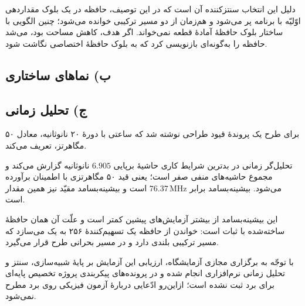 \documentclass[12pt,a4paper]{article}
\begin{document}
	دلیل این انتخاب سنتز‌کننده آن است که در این توصیف، حافظه در یک بلوک مقداردهی اوّلیّه با برنامه پر می‌شود و هم‌زمان از دو مسیر ترکیبی خوانده می‌شود؛ چنین الگویی با ساختار بلوک حافظهٔ آمادهٔ قطعه نمی‌خواند. اگر هدف، کاهش مساحت بود، می‌شد حافظه را به‌گونه‌ای بازنویسی کرد که به بلوک حافظهٔ اختصاصی نگاشت شود.

	\subsection*{ب) نماهای ساختاری}

	\subsection*{ج) تحلیل زمانی}
	برای طرح یک پروندهٔ قیود طراحی نوشته شد که ساعتی با دورهٔ ۲۰ نانوثانیه، معادل ۵۰ مگاهرتز، تعریف می‌کند.



	تحلیل‌گر زمانی در بدترین شرایط کاری حاشیهٔ برپایی \(6.905\) نانوثانیه گزارش می‌کند و مجموع حاشیه‌های منفی صفر است؛ یعنی قید ۵۰ مگاهرتزی با اطمینان برآورده می‌شود. بیشینه‌بسامد برابر \(76.37\,\mathrm{MHz}\) است و بیشینه‌بسامد مقیّد نیز همین مقدار است.


	این بیشینه‌بسامد از بیشتر آزمایش‌های پیشین کمتر است و علّت آن همان حافظهٔ ساخته‌شده با ثبات است: خواندن از حافظه یک تسهیم‌کنندهٔ ۲۵۶ به یک می‌سازد که مسیر ترکیبی بلندی دارد و در مسیر بحرانی طرح قرار می‌گیرد.

	با توجّه به برگزاری مجازی آزمایشگاه، ارزیابی این آزمایش بر پایهٔ شبیه‌سازی، سنتز و تحلیل زمانی نرم‌افزاری انجام شده و در پرونده‌های پیکربندی پروژه تخصیص پایه‌ای برای برد ثبت نشده است؛ ازاین‌رو ادّعایی دربارهٔ آزمون فیزیکی روی برد مطرح نمی‌شود.
\end{document}
